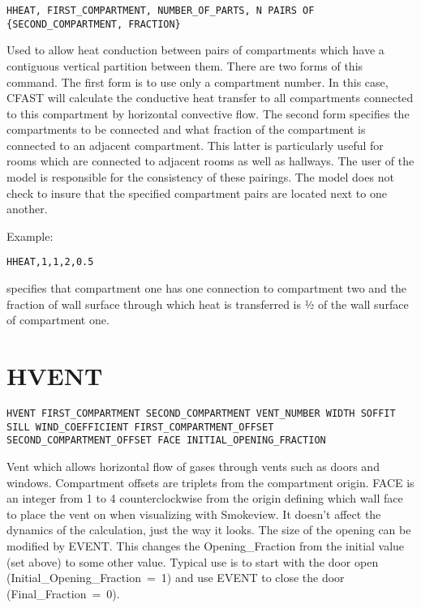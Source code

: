 \begin{lstlisting}
HHEAT, FIRST_COMPARTMENT, NUMBER_OF_PARTS, N PAIRS OF {SECOND_COMPARTMENT, FRACTION}
\end{lstlisting}

Used to allow heat conduction between pairs of compartments which have a contiguous vertical partition between them.  There are two forms of this command. The first form is to use only a compartment number. In this case, CFAST will calculate the conductive heat transfer to all compartments connected to this compartment by horizontal convective flow. The second form specifies the compartments to be connected and what fraction of the compartment is connected to an adjacent compartment. This latter is particularly useful for rooms which are connected to adjacent rooms as well as hallways. The user of the model is responsible for the consistency of these pairings.  The model does not check to insure that the specified compartment pairs are located next to one another.

Example:

\begin{lstlisting}
HHEAT,1,1,2,0.5
\end{lstlisting}
specifies that compartment one has one connection to compartment two and the fraction of wall surface through which heat is transferred is ½ of the wall surface of compartment one.

\section{HVENT}

\begin{lstlisting}
HVENT FIRST_COMPARTMENT SECOND_COMPARTMENT VENT_NUMBER WIDTH SOFFIT SILL WIND_COEFFICIENT FIRST_COMPARTMENT_OFFSET SECOND_COMPARTMENT_OFFSET FACE INITIAL_OPENING_FRACTION
\end{lstlisting}

Vent which allows horizontal flow of gases through vents such as doors and windows. Compartment offsets are triplets from the compartment origin.  FACE is an integer from 1 to 4 counterclockwise from the origin defining which wall face to place the vent on when visualizing with Smokeview. It doesn't affect the dynamics of the calculation, just the way it looks. The size of the opening can be modified by EVENT. This changes the Opening\_Fraction from the initial value (set above) to some other value. Typical use is to start with the door open (Initial\_Opening\_Fraction~=~1) and use EVENT to close the door (Final\_Fraction~=~0).

